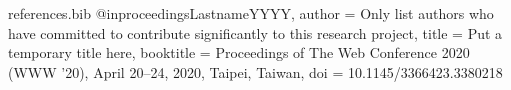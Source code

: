 \begin{filecontents*}{references.bib}
@inproceedings{LastnameYYYY,
  author    = {Only list authors who have committed to contribute
  significantly to this research project},
  title        = {Put a temporary title here},
  booktitle    = {Proceedings of The Web Conference 2020 (WWW '20), April 20--24, 2020, Taipei, Taiwan},
  doi          = {10.1145/3366423.3380218}
}
\end{filecontents*}
\newcommand{\theReferenceText}{\fullcite{LastnameYYYY}}

